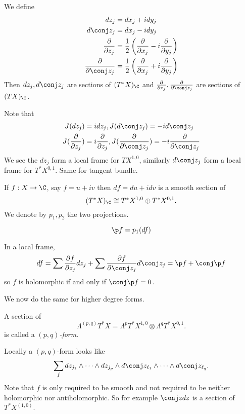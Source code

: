 \documentclass[a4paper]{article}
\newcommand{\w}{\wedge} %
\begin{document}
\begin{definition}
  We define
  \begin{align*}
    dz_j &= dx_j + idy_j \\
    d\conj z_j &= dx_j - idy_j \\
    \frac{\partial  }{\partial z_j} &= \frac{1}{2} \left( \frac{\partial  }{\partial x_j} - i \frac{\partial  }{\partial y_j} \right) \\
    \frac{\partial  }{\partial \conj z_j} &= \frac{1}{2} \left( \frac{\partial  }{\partial x_j} + i \frac{\partial  }{\partial y_j} \right)
  \end{align*}
  Then \(dz_j, d\conj z_j\) are sections of \((T^*X)_\C\) and \(\frac{\partial  }{\partial z_j}, \frac{\partial  }{\partial \conj z_j}\) are sections of \((TX)_\C\).
\end{definition}

Note that
\begin{align*}
  J(dz_j) &= i dz_j, J(d\conj z_j) = -i d\conj z_j \\
  J(\frac{\partial  }{\partial z_j}) &= i \frac{\partial  }{\partial z_j}, J(\frac{\partial  }{\partial \conj z_j}) = -i \frac{\partial  }{\partial \conj z_j}
\end{align*}
We see the \(dz_j\) form a local frame for \(TX^{1, 0}\), similarly \(d\conj z_j\) form a local frame for \(T^*X^{0, 1}\). Same for tangent bundle.

If \(f: X \to \C\), say \(f = u + iv\) then \(df = du + idv\) is a smooth section of
\[
  (T^*X)_\C \cong T^*X^{1, 0} \oplus T^*X^{0, 1}.
\]
We denote by \(p_1, p_2\) the two projections.

\begin{definition}
  \[
    \p f = p_1 (df)
  \]
\end{definition}

In a local frame,
\[
  df
  = \sum \frac{\partial f}{\partial z_j} dz_j + \sum \frac{\partial f}{\partial \conj z_j} d\conj z_j
  = \p f + \conj \p f
\]
so \(f\) is holomorphic if and only if \(\conj \p f = 0\).

We now do the same for higher degree forms.

\begin{definition}[form]
  A section of
  \[
    \Lambda^{(p, q)}T^*X = \Lambda^pT^*X^{1, 0} \otimes \Lambda^qT^*X^{0, 1}.
  \]
  is called a \emph{\((p, q)\)-form}.
\end{definition}

Locally a \((p, q)\)-form looks like
\[
  \sum_f dz_{j_1} \w \dots \w dz_{j_p} \w d\conj z_{\ell_1} \w \dots \w d\conj z_{\ell_q}.
\]
Note that \(f\) is only required to be smooth and not required to be neither holomorphic nor antiholomorphic. So for example \(\conj z dz\) is a section of \(T^*X^{(1, 0)}\).
\end{document}
